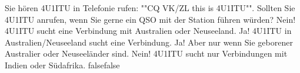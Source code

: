     {Sie hören 4U1ITU in Telefonie rufen: ""CQ VK/ZL this is 4U1ITU"". Sollten Sie 4U1ITU anrufen, wenn Sie gerne ein QSO mit der Station führen würden?}
    {Nein! 4U1ITU sucht eine Verbindung mit Australien oder Neuseeland.}
    {Ja! 4U1ITU in Australien/Neuseeland sucht eine Verbindung.}
    {Ja! Aber nur wenn Sie geborener Australier oder Neuseeländer sind.}
    {Nein! 4U1ITU sucht nur Verbindungen mit Indien oder Südafrika.}
    {false}{false}
